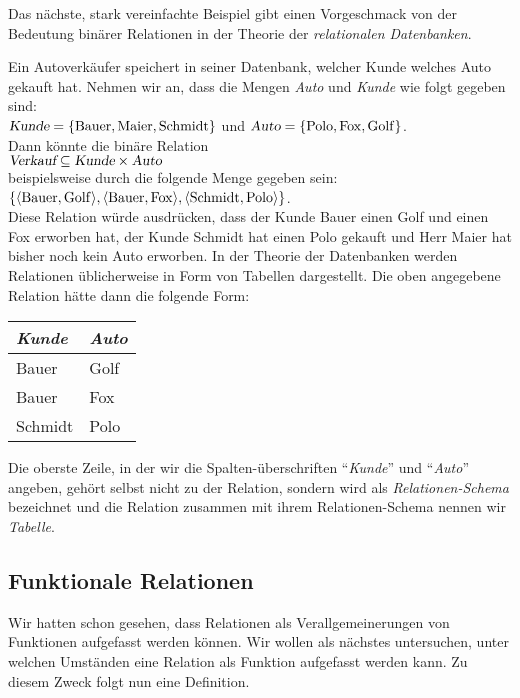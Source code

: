 \noindent
Das n\"{a}chste, stark vereinfachte Beispiel gibt einen Vorgeschmack von der Bedeutung bin\"{a}rer
Relationen in der Theorie der \emph{relationalen Datenbanken}.

\example
Ein Autoverk\"{a}ufer speichert in seiner Datenbank, welcher Kunde welches Auto gekauft hat.
Nehmen wir an, dass die Mengen \textsl{Auto} und \textsl{Kunde} wie folgt gegeben sind:
\\[0.2cm]
\hspace*{1.3cm}
$\textsl{Kunde} = \{ \mathrm{Bauer}, \mathrm{Maier}, \mathrm{Schmidt} \}$
\quad und \quad
$\textsl{Auto} = \{ \mathrm{Polo}, \mathrm{Fox}, \mathrm{Golf} \}$.
\\[0.2cm]
Dann k\"{o}nnte die bin\"{a}re Relation 
\\[0.2cm]
\hspace*{1.3cm}
$\textsl{Verkauf} \subseteq \textsl{Kunde} \times \textsl{Auto}$
\\[0.2cm]
beispielsweise durch die folgende Menge gegeben sein:
\\[0.2cm]
\hspace*{1.3cm}
$\{ \pair(\mathrm{Bauer}, \mathrm{Golf}), \pair(\mathrm{Bauer}, \mathrm{Fox}), \pair(\mathrm{Schmidt}, \mathrm{Polo})\}$.
\\[0.2cm]
Diese Relation w\"{u}rde ausdr\"{u}cken, dass der Kunde Bauer einen Golf und einen Fox erworben
hat, der Kunde Schmidt hat einen Polo gekauft und Herr Maier hat bisher noch kein Auto erworben.
In der Theorie der Datenbanken werden Relationen \"{u}blicherweise in Form von Tabellen
dargestellt. Die oben angegebene Relation h\"{a}tte dann die folgende Form:
\begin{center}
  \begin{tabular}[c]{|l|l|}
\hline
\textsl{Kunde} & \textsl{Auto} \\
\hline
\hline
  Bauer   & Golf \\
\hline
  Bauer   & Fox  \\
\hline
  Schmidt & Polo \\
\hline
  \end{tabular}
\end{center}
Die oberste Zeile, in der wir die Spalten-\"{u}berschriften ``\textsl{Kunde}'' und ``\textsl{Auto}''
angeben,  geh\"{o}rt selbst nicht zu der Relation, sondern wird als \emph{Relationen-Schema}
bezeichnet und die Relation zusammen mit ihrem Relationen-Schema nennen wir \emph{Tabelle}.  


\subsection{Funktionale Relationen}
Wir hatten schon gesehen, dass Relationen als Verallgemeinerungen von Funktionen aufgefasst werden
k\"{o}nnen.  Wir wollen als n\"{a}chstes untersuchen, unter welchen Umst\"{a}nden eine Relation als Funktion aufgefasst
werden kann.  Zu diesem Zweck folgt nun eine Definition.


